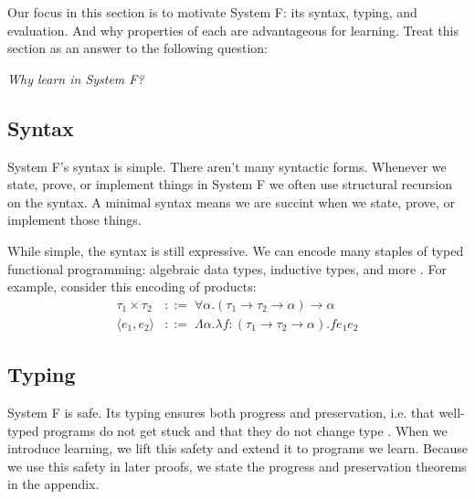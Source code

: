 \documentclass[acmsmall]{acmart}
\theoremstyle{mytheoremstyle}
\begin{document}
Our focus in this section is to motivate System F: its syntax, typing, and evaluation. And why properties of each are advantageous for learning. Treat this section as an answer to the following question: 
\begin{displayquote}
\textit{Why learn in System F?}
\centering
\end{displayquote}
\subsection{Syntax}

System F's syntax is simple. There aren't many syntactic forms. Whenever we state, prove, or implement things in System F we often use structural recursion on the syntax. A minimal syntax means we are succint when we state, prove, or implement those things.

While simple, the syntax is still expressive. We can encode many staples of typed functional programming: algebraic data types, inductive types, and more \cite{pierce2002types}. For example, consider this encoding of products:
\begin{align*}
\tau_1 \times \tau_2 \,&::=\; \forall \alpha.(\tau_1 \to \tau_2 \to \alpha) \to \alpha\\
\langle e_1,e_2 \rangle &::=\; \Lambda \alpha.\lambda f\!:\!(\tau_1 \to \tau_2 \to \alpha).fe_1e_2 
\end{align*}

\subsection{Typing}
System F is safe. Its typing ensures both progress and preservation, i.e. that well-typed programs do not get stuck and that they do not change type \cite{pierce2002types}. When we introduce learning, we lift this safety and extend it to programs we learn. Because we use this safety in later proofs, we state the progress and preservation theorems in the appendix.
\end{document}

